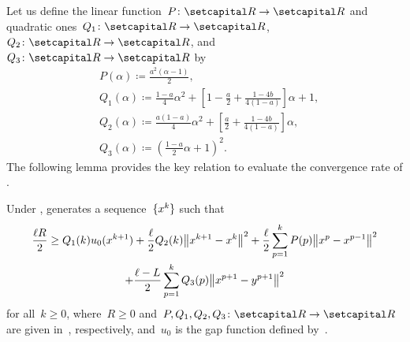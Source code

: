 \documentclass[../main]{subfiles}
\begin{document}
Let us define the linear function~$P \colon \setR \to \setR$ and quadratic ones~$Q_1 \colon \setR \to \setR$,~$Q_2 \colon \setR \to \setR$, and~$Q_3 \colon \setR \to \setR$ by
\begin{equation} \label{eq:P Q}
    \begin{aligned}
    &P(\alpha) \coloneqq \frac{a^2 (\alpha - 1)}{2},\\
    &Q_1(\alpha) \coloneqq \frac{1 - a}{4} \alpha^2 + \left[ 1 - \frac{a}{2} + \frac{1 - 4 b}{4 (1 - a)} \right] \alpha + 1,\\
    &Q_2(\alpha) \coloneqq \frac{a (1 - a)}{4} \alpha^2 + \left[ \frac{a}{2} + \frac{1 - 4 b}{4 (1 - a)} \right] \alpha, \\
    &Q_3(\alpha) \coloneqq \left( \frac{1 - a}{2} \alpha + 1 \right)^2
    .\end{aligned}
\end{equation}
The following lemma provides the key relation to evaluate the convergence rate of .
\begin{lemma} 
    Under ,  generates a sequence~$\lbrace x^k\rbrace$ such that
    \begin{multline}
        \frac{\ell R}{2} \ge Q_1(k) u_0(x^{k + 1}) + \frac{\ell}{2} Q_2(k) \norm*{x^{k + 1} - x^k}^2 + \frac{\ell}{2} \sum_{p = 1}^{k} P(p) \norm*{x^p - x^{p - 1}}^2 \\
         +  \frac{\ell - L}{2} \sum_{p = 1}^{k} Q_3(p) \norm*{x^{p + 1} - y^{p + 1}}^2
    \end{multline}
    for all~$k \ge 0$, where~$R \ge 0$ and~$P, Q_1, Q_2, Q_3 \colon \setR \to \setR$ are given in~, respectively, and~$u_0$ is the gap function defined by~.
\end{lemma}
\end{document}
